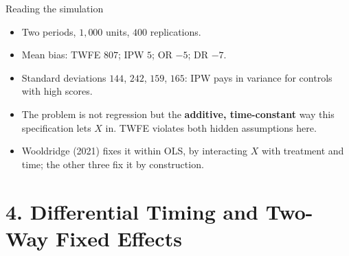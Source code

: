 \documentclass[
  11pt,
  ignorenonframetext,
  aspectratio=169,
]{beamer}
\providecommand{\tightlist}{%
  \setlength{\itemsep}{0pt}\setlength{\parskip}{0pt}}
\begin{document}
\begin{frame}{Reading the simulation}
\protect{}\label{reading-the-simulation}
\begin{itemize}
\tightlist
\item
  Two periods, \(1{,}000\) units, \(400\) replications.
\item
  Mean bias: TWFE \(807\); IPW \(5\); OR \(-5\); DR \(-7\).
\item
  Standard deviations \(144\), \(242\), \(159\), \(165\): IPW pays in
  variance for controls with high scores.
\end{itemize}

\vspace{0.4em}

\begin{itemize}
\tightlist
\item
  The problem is not regression but the \textbf{additive, time-constant}
  way this specification lets \(X\) in. TWFE violates both hidden
  assumptions here.
\item
  Wooldridge (2021) fixes it within OLS, by interacting \(X\) with
  treatment and time; the other three fix it by construction.
\end{itemize}
\end{frame}

\section{4. Differential Timing and Two-Way Fixed
Effects}\label{differential-timing-and-two-way-fixed-effects}
\end{document}
